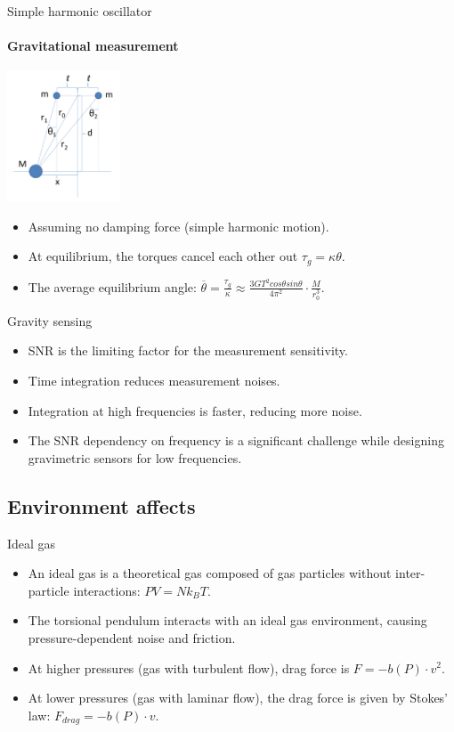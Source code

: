 \documentclass{beamer}
\begin{document}
\begin{frame}{Simple harmonic oscillator}
	\framesubtitle{Gravitational measurement}
	\begin{center}		
		\includegraphics[width=0.25\textwidth,keepaspectratio]{Cavendish apparatus.PNG}
    \end{center}
	\begin{itemize}
		\item Assuming no damping force (simple harmonic motion).
		\item At equilibrium, the torques cancel each other out $\tau_g =  \kappa\theta$.
		\item The average equilibrium angle: $\overline{\theta} = \frac{\tau_g}{\kappa} \approx \frac{3GT^2cos\theta sin\theta}{4\pi^2 } \cdot \frac{M}{r_0^3}$.
		
	\end{itemize}
\end{frame}
\begin{frame}{Gravity sensing}
	
	
	\begin{itemize}
		\item SNR is the limiting factor for the measurement sensitivity.
		\item Time integration reduces measurement noises. 
		\pause
		\item Integration at high frequencies is faster, reducing more noise.
		\pause
		\item The SNR dependency on frequency is a significant challenge while designing gravimetric sensors for low frequencies.

	\end{itemize}
\end{frame}


\subsection{Environment affects}
\begin{frame}{Ideal gas}
	\begin{itemize}
		\item An ideal gas is a theoretical gas composed of gas particles without inter-particle interactions: $PV =  N k_B T $.
		\item The torsional pendulum interacts with an ideal gas environment, causing pressure-dependent noise and friction.
		\pause
		\item At higher pressures (gas with turbulent flow), drag force is $F = -b(P)\cdot v^2 $.
		\item At lower pressures (gas with laminar flow), the drag force is given by Stokes' law: $F_{drag} =  -b(P)\cdot v$.
		
	\end{itemize}
\end{frame}
\end{document}
